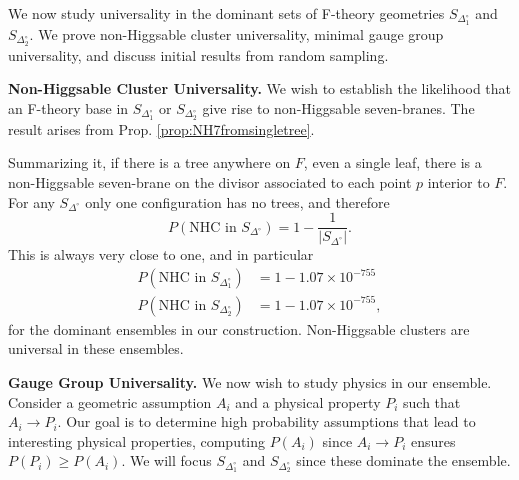 \documentclass[aps,prl,twocolumn, superscriptaddress,groupedaddress,nofootinbib]{revtex4}
\newcommand{\sdoc}{S_{\Delta_1^\circ}}
\newcommand{\sdtc}{S_{\Delta_2^\circ}}
\begin{document}
\vspace{.2cm}

We now study universality in the dominant sets of
F-theory geometries $\sdoc$ and $\sdtc$. We prove non-Higgsable cluster universality, minimal gauge group universality,
and discuss initial results from random sampling.

\vspace{.2cm}
\noindent \textbf{Non-Higgsable Cluster Universality.} We wish to establish
the likelihood that an F-theory base in $\sdoc$ or $\sdtc$ give rise to
non-Higgsable seven-branes. The result arises from Prop. \ref{prop:NH7fromsingletree}.



Summarizing it, if there is a tree anywhere on $F$, even a single leaf, there is a
non-Higgsable seven-brane on the divisor associated to each point $p$ interior to $F$.
For any $S_{\Delta^\circ}$ only one configuration has no trees, and therefore
\begin{equation}
P(\text{NHC in } S_{\Delta^\circ}) = 1 - \frac{1}{|S_{\Delta^\circ}|}.
\end{equation}
This is always very close to one, and in particular
\begin{align}
P(\text{NHC in } \sdoc) &= 1-1.07\times 10^{-755} \nonumber \\
P(\text{NHC in } \sdtc) &= 1-1.07\times 10^{-755},
\end{align}
for the dominant ensembles in our construction. Non-Higgsable clusters are universal in these ensembles.

\vspace{.2cm}
\noindent \textbf{Gauge Group Universality.} We now wish to study physics in
our ensemble. Consider a geometric assumption $A_i$
and a physical property $P_i$ such that $A_i\to P_i$. Our goal is to determine high
probability assumptions that lead to interesting physical properties, computing $P(A_i)$
since $A_i\to P_i$ ensures $P(P_i)\geq P(A_i).$ We will focus $\sdoc$ and $\sdtc$ since
these dominate the ensemble.
\end{document}
